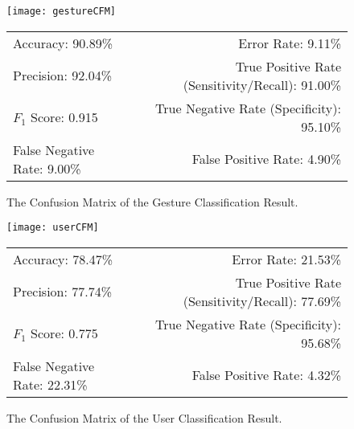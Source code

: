 \begin{figure}[!h]
	\centering
	\begin{minipage}{.35\linewidth}
		\texttt{[image: gestureCFM]}
		\vspace{.05in}
	\end{minipage}
	
	\centering
	\begin{tabular}{lr}
		\toprule
		Accuracy: 90.89\% & \hspace{-.55in} Error Rate: 9.11\% \\
		Precision: 92.04\% & \hspace{-.55in} True Positive Rate (Sensitivity/Recall): 91.00\% \\
		$F_1$ Score: 0.915 & \hspace{-.55in} True Negative Rate (Specificity): 95.10\% \\
		False Negative Rate: 9.00\%  & \hspace{-.55in} False Positive Rate: 4.90\% \\
		\bottomrule
	\end{tabular}
	\caption{The Confusion Matrix of the Gesture Classification Result.
	}
	\label{fig:gestureCFM}
\end{figure}

\begin{figure}[!h]
	\centering
	\begin{minipage}{.45\linewidth}
		\texttt{[image: userCFM]}
		\vspace{.05in}
	\end{minipage}
	
	\centering
	\begin{tabular}{lr}
		\toprule
		Accuracy: 78.47\% & \hspace{-.55in} Error Rate: 21.53\% \\
		Precision: 77.74\% & \hspace{-.55in} True Positive Rate (Sensitivity/Recall): 77.69\% \\
		$F_1$ Score: 0.775 & \hspace{-.55in} True Negative Rate (Specificity): 95.68\% \\
		False Negative Rate: 22.31\%  & \hspace{-.55in} False Positive Rate: 4.32\% \\
		\bottomrule
	\end{tabular}
	\caption{The Confusion Matrix of the User Classification Result.
	}
	\label{fig:userCFM}
\end{figure}

